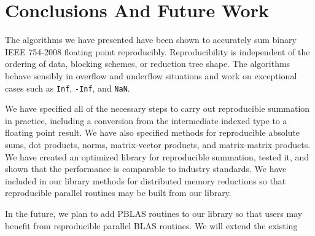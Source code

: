 \section{Conclusions And Future Work}
  The algorithms we have presented have been shown to accurately sum binary IEEE 754-2008 floating point reproducibly. Reproducibility is independent of the ordering of data, blocking schemes, or reduction tree shape. The algorithms behave sensibly in overflow and underflow situations and work on exceptional cases such as \texttt{Inf}, \texttt{-Inf}, and \texttt{NaN}.

   We have specified all of the necessary steps to carry out reproducible summation in practice, including a conversion from the intermediate indexed type to a floating point result. We have also specified methods for reproducible absolute sums, dot products, norms, matrix-vector products, and matrix-matrix products. We have created an optimized library for reproducible summation, tested it, and shown that the performance is comparable to industry standards. We have included in our library methods for distributed memory reductions so that reproducible parallel routines may be built from our library.

   In the future, we plan to add PBLAS routines to our library so that users may benefit from reproducible parallel BLAS routines. We will extend the existing 

